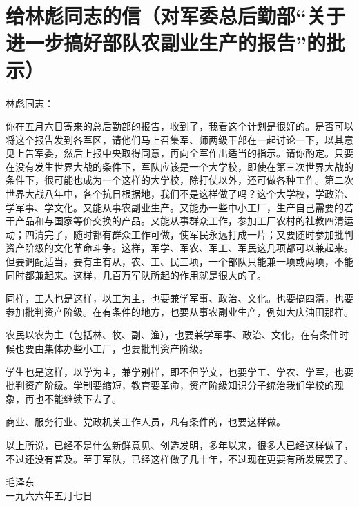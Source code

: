 \section[给林彪同志的信（对军委总后勤部“关于进一步搞好部队农副业生产的报告”的批示）（一九六六年五月七日）]{给林彪同志的信（对军委总后勤部“关于进一步搞好部队农副业生产的报告”的批示）}


林彪同志：

你在五月六日寄来的总后勤部的报告，收到了，我看这个计划是很好的。是否可以将这个报告发到各军区，请他们马上召集军、师两级干部在一起讨论一下，以其意见上告军委，然后上报中央取得同意，再向全军作出适当的指示。请你酌定。只要在没有发生世界大战的条件下，军队应该是一个大学校，即使在第三次世界大战的条件下，很可能也成为一个这样的大学校，除打仗以外，还可做各种工作。第二次世界大战八年中，各个抗日根据地，我们不是这样做了吗？这个大学校，学政治、学军事、学文化。又能从事农副业生产。又能办一些中小工厂，生产自己需要的若干产品和与国家等价交换的产品。又能从事群众工作，参加工厂农村的社教四清运动；四清完了，随时都有群众工作可做，使军民永远打成一片；又要随时参加批判资产阶级的文化革命斗争。这样，军学、军农、军工、军民这几项都可以兼起来。但要调配适当，要有主有从，农、工、民三项，一个部队只能兼一项或两项，不能同时都兼起来。这样，几百万军队所起的作用就是很大的了。

同样，工人也是这样，以工为主，也要兼学军事、政治、文化。也要搞四清，也要参加批判资产阶级。在有条件的地方，也要从事农副业生产，例如大庆油田那样。

农民以农为主（包括林、牧、副、渔），也要兼学军事、政治、文化，在有条件时候也要由集体办些小工厂，也要批判资产阶级。

学生也是这样，以学为主，兼学别样，即不但学文，也要学工、学农、学军，也要批判资产阶级。学制要缩短，教育要革命，资产阶级知识分子统治我们学校的现象，再也不能继续下去了。

商业、服务行业、党政机关工作人员，凡有条件的，也要这样做。

以上所说，已经不是什么新鲜意见、创造发明，多年以来，很多人已经这样做了，不过还没有普及。至于军队，已经这样做了几十年，不过现在更要有所发展罢了。

{\raggedleft 毛泽东\\一九六六年五月七日\par}


